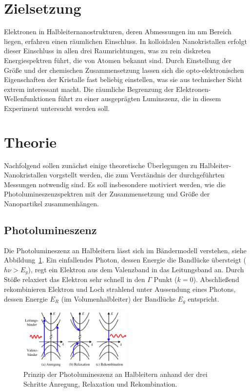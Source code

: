 \setcounter{page}{1}
\section*{Zielsetzung}
Elektronen in Halbleiternanostrukturen, deren Abmessungen im $\si{\nano\meter}$ Bereich liegen,
erfahren einen räumlichen Einschluss. In kolloidalen Nanokristallen erfolgt dieser Einschluss
in allen drei Raumrichtungen, was zu rein diskreten Energiespektren führt, die von Atomen bekannt sind.
Durch Einstellung der Größe und der chemischen Zusammensetzung lassen sich die opto-elektronischen
Eigenschaften der Kristalle fast beliebig einstellen, was sie aus technischer Sicht extrem interessant macht.
Die räumliche Begrenzung der Elektronen-Wellenfunktionen führt zu einer ausgeprägten Luminszenz, die
in diesem Experiment untersucht werden soll.

\section{Theorie}
Nachfolgend sollen zunächst einige theoretische Überlegungen zu Halbleiter-Nanokristallen vorgstellt werden, die
zum Verständnis der durchgeführten Messungen notwendig sind. Es soll insbesondere motiviert werden, wie die
Photolumineszenzspektren mit der Zusammensetzung und Größe der Nanopartikel zusammenhängen.

\subsection{Photolumineszenz}
Die Photolumineszenz an Halbleitern lässt sich im Bändermodell verstehen, siehe Abbildung~\ref{fig: pl}. Ein
einfallendes Photon, dessen Energie die Bandlücke übersteigt ($h\nu > E_g$), regt ein Elektron aus dem
Valenzband in das Leitungsband an.
Durch Stöße relaxiert das Elektron sehr schnell in den $\Gamma$ Punkt ($k = 0$). Abschließend rekombinieren Elektron und Loch
strahlend unter Aussendung eines Photons, dessen Energie $E_R$ (im Volumenhalbleiter) der Bandlücke $E_g$ entspricht.

\begin{figure}
  \centering
  \includegraphics[width = 0.5\textwidth]{pics/PL.png}
  \caption{Prinzip der Photolumineszenz an Halbleitern anhand der drei Schritte Anregung, Relaxation und Rekombination.}
  \label{fig: pl}
\end{figure}


